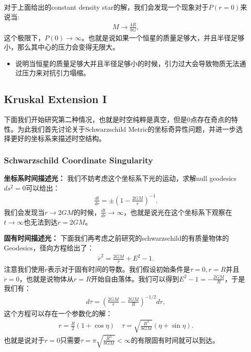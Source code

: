 对于上面给出的constant density star的解，我们会发现一个现象对于$ P(r = 0) $来说当:
\begin{align}
  M \to \frac{4R}{9G},
\end{align}
这个极限下，$ P(0) \to \infty $。也就是说如果一个恒星的质量足够大，并且半径足够小，那么其中心的压力会变得无限大。
\begin{itemize}
  \item 说明当恒星的质量足够大并且半径足够小的时候，引力过大会导致物质无法通过压力来对抗引力塌缩。
\end{itemize}

\subsection{Kruskal Extension I}

下面我们开始研究第二种情况，也就是时空纯粹是真空，但是0点存在奇点的特性。为此我们首先讨论关于Schwarzschild
Metric的坐标奇异性问题，并进一步选择更好的坐标系来描述时空结构。

\subsubsection{Schwarzschild Coordinate Singularity}


\textbf{坐标系时间描述光：}
我们不妨考虑这个坐标系下光的运动，求解null geodesics $ ds^2 = 0 $可以给出：
\begin{align}
  \frac{dt}{dr}=\pm\left(1-\frac{2GM}{r}\right)^{-1}.
\end{align}
我们会发现当$ r \to 2GM $的时候，$ \frac{dt}{dr} \to \infty $，也就是说光在这个坐标系下观察在$
t \to \infty $也无法到达$ r = 2GM $。

\textbf{固有时间描述光：}
下面我们再考虑之前研究的schwarzschild的有质量物体的Geodesics，径向方程给出了：
\begin{align}
  \dot{r}^2=\frac{2GM}{r}+E^2-1.
\end{align}
注意我们使用$ \dot{r} $表示对于固有时间的导数。我们假设初始条件是$ \tau = 0, r = R $并且$ \dot{r}
= 0 $，也就是说物体从$ r = R $开始自由落体。我们可以得到$ E^2 - 1 = -\frac{2GM}{R} $，于是我们有：
\begin{align}
  d\tau=\left(\frac{2GM}{r}-\frac{2GM}{R}\right)^{-1/2}dr,
\end{align}
这个方程可以存在一个参数化的解：
\begin{align}
  r=\frac{R}{2}(1+\cos\eta)\quad \tau=\sqrt{\frac{R^3}{8GM}}(\eta+\sin\eta).
\end{align}
也就是说对于$ r = 0 $只需要$ \tau = \pi \sqrt{\frac{R^3}{8GM}} < \infty $的有限固有时间就可以到达。


